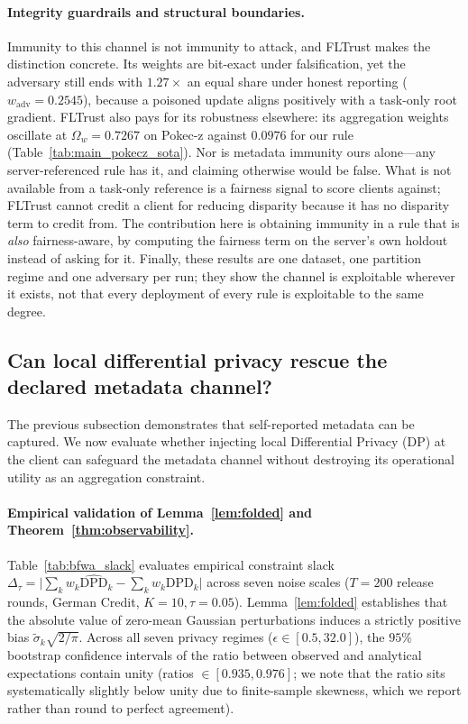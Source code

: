 \documentclass[preprint,12pt]{elsarticle}
\theoremstyle{plain}
\theoremstyle{definition}
\theoremstyle{remark}
\newcommand{\dpd}{\mathrm{DPD}}
\begin{document}
\paragraph{Integrity guardrails and structural boundaries.} Immunity to this channel is not immunity to attack, and FLTrust makes the distinction concrete. Its weights are bit-exact under falsification, yet the adversary still ends with $1.27\times$ an equal share under honest reporting ($w_{\mathrm{adv}} = 0.2545$), because a poisoned update aligns positively with a task-only root gradient. FLTrust also pays for its robustness elsewhere: its aggregation weights oscillate at $\Omega_w = 0.7267$ on Pokec-z against $0.0976$ for our rule (Table~\ref{tab:main_pokecz_sota}). Nor is metadata immunity ours alone---any server-referenced rule has it, and claiming otherwise would be false. What is not available from a task-only reference is a fairness signal to score clients against; FLTrust cannot credit a client for reducing disparity because it has no disparity term to credit from. The contribution here is obtaining immunity in a rule that is \emph{also} fairness-aware, by computing the fairness term on the server's own holdout instead of asking for it. Finally, these results are one dataset, one partition regime and one adversary per run; they show the channel is exploitable wherever it exists, not that every deployment of every rule is exploitable to the same degree.

\subsection{Can local differential privacy rescue the declared metadata channel?}
\label{sec:res_privacy}
\label{sec:res_slack}





The previous subsection demonstrates that self-reported metadata can be captured. We now evaluate whether injecting local Differential Privacy (DP) at the client can safeguard the metadata channel without destroying its operational utility as an aggregation constraint.

\paragraph{Empirical validation of Lemma~\ref{lem:folded} and Theorem~\ref{thm:observability}.}
Table~\ref{tab:bfwa_slack} evaluates empirical constraint slack $\Delta_\tau = \lvert \sum_k w_k \widehat{\dpd}_k - \sum_k w_k \dpd_k \rvert$ across seven noise scales ($T=200$ release rounds, German Credit, $K=10, \tau=0.05$). Lemma~\ref{lem:folded} establishes that the absolute value of zero-mean Gaussian perturbations induces a strictly positive bias $\tilde{\sigma}_k \sqrt{2/\pi}$. Across all seven privacy regimes ($\epsilon \in [0.5, 32.0]$), the $95\%$ bootstrap confidence intervals of the ratio between observed and analytical expectations contain unity (ratios $\in [0.935, 0.976]$; we note that the ratio sits systematically slightly below unity due to finite-sample skewness, which we report rather than round to perfect agreement).
\end{document}
